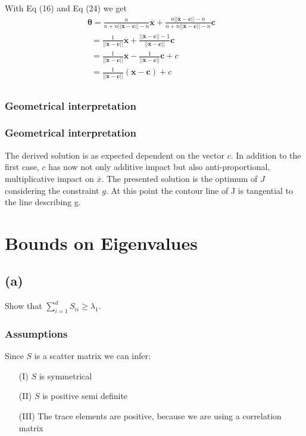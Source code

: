 \documentclass{article}
\begin{document}
With Eq (16) and Eq (24) we get
\begin{align*}
&\boldsymbol{\theta}= \frac{n}{n + n ||\boldsymbol{\overline{x}} - \boldsymbol{c} || - n }\boldsymbol{\overline{x}} + \frac{n ||\boldsymbol{\overline{x}} - \boldsymbol{c} || - n}{n + n ||\boldsymbol{\overline{x}} - \boldsymbol{c} || - n}  \boldsymbol{c}&&\\
&~~= \frac{1}{||\boldsymbol{\overline{x}} - \boldsymbol{c} ||}\boldsymbol{\overline{x}} + \frac{||\boldsymbol{\overline{x}} - \boldsymbol{c} || - 1}{||\boldsymbol{\overline{x}} - \boldsymbol{c} ||}  \boldsymbol{c}&&\\
&~~= \frac{1}{||\boldsymbol{\overline{x}} - \boldsymbol{c} ||}\boldsymbol{\overline{x}}  - \frac{1}{||\boldsymbol{\overline{x}} - \boldsymbol{c} ||}  \boldsymbol{c} + c&&\\
&~~= \frac{1}{||\boldsymbol{\overline{x}} - \boldsymbol{c} ||}(\boldsymbol{\overline{x}}  - \boldsymbol{c}) + c&&\\
\end{align*}
\subsubsection*{Geometrical interpretation}
\subsubsection*{Geometrical interpretation}
The derived solution is as expected dependent on the vector $c$. In addition to the first case, $c$ has now not only additive impact but also anti-proportional, multiplicative impact
on $\overline{x}$. The presented solution is the optimum of $J$ considering the constraint $g$. At this point the contour line of J is tangential to the line describing g.


\section{Bounds on Eigenvalues }
\subsection*{(a)}
Show that $\sum \limits _{i=1}^d S_{ii} \geq \lambda_1$.
\subsubsection*{Assumptions}
Since $S$ is a scatter matrix we can infer:
\begin{itemize}
	\item[(I)] $S$ is symmetrical 
	\item[(II)] $S$ is positive semi definite
	\item[(III)] The trace elements are positive, because we are using a correlation matrix
\end{itemize}
\end{document}
